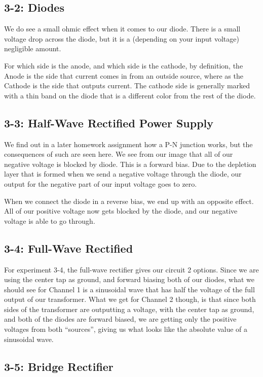 \documentclass[%
 aip,
 jmp,
 amsmath,
 amssymb,
 reprint,%
 numerical,
 longbibliography,
]{revtex4-1}
\begin{document}
	\subsection{3-2: Diodes}
	
	We do see a small ohmic effect when it comes to our diode. There is a small voltage drop across
	the diode, but it is a (depending on your input voltage) negligible amount.
	
	For which side is the anode, and which side is the cathode, by definition, the Anode is the side
	that current comes in from an outside source, where as the Cathode is the side that outputs current.
	The cathode side is generally marked with a thin band on the diode that is a different color from the
	rest of the diode.
	
	\subsection{3-3: Half-Wave Rectified Power Supply}
	
	We find out in a later homework assignment how a P-N junction works, but the consequences of
	such are seen here. We see from our image that all of our negative voltage is blocked by diode.
	This is a forward bias. Due to the depletion layer that is formed when we send a negative voltage
	through the diode, our output for the negative part of our input voltage goes to zero.
	
	When we connect the diode in a reverse bias, we end up with an opposite effect. All of our positive
	voltage now gets blocked by the diode, and our negative voltage is able to go through.
	
	\subsection{3-4: Full-Wave Rectified}
	
	For experiment 3-4, the full-wave rectifier gives our circuit 2 options. Since we are using the 
	center tap as ground, and forward biasing both of our diodes, what we should see for Channel 1
	is a sinusoidal wave that has half the voltage of the full output of our transformer. What we get
	for Channel 2 though, is that since both sides of the transformer are outputting a voltage, with
	the center tap as ground, and both of the diodes are forward biased, we are getting only the 
	positive voltages from both "`sources"', giving us what looks like the absolute value of a 
	sinusoidal wave.
	
	\subsection{3-5: Bridge Rectifier}
	
\end{document}
